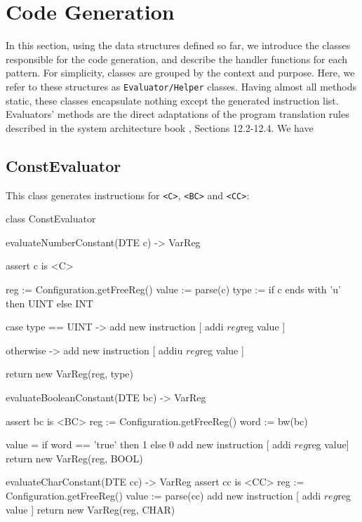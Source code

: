 \section{Code Generation}\label{sec:code_gen}
In this section, using the data structures defined so far, we introduce the classes responsible for the code generation, and describe the handler
functions for each pattern. For simplicity, classes are grouped by the context and purpose. Here, we refer to these structures as
\verb+Evaluator/Helper+ classes. Having almost all methods static, these classes encapsulate nothing except the generated instruction list.
Evaluators' methods are the direct adaptations of the program translation rules described in the system architecture book
\cite{sysbook}, Sections 12.2-12.4. We have
\subsection{ConstEvaluator}
This class generates instructions for \verb+<C>+, \verb+<BC>+ and \verb+<CC>+:
\begin{codeblock}
class ConstEvaluator {
    evaluateNumberConstant(DTE c) -> VarReg {
        assert c is <C>

        reg := Configuration.getFreeReg()
        value := parse(c)
        type := if c ends with 'u' then UINT else INT

        case type == UINT -> {
            add new instruction [ addi $reg $reg value ]
        }

        otherwise -> {
            add new instruction [ addiu $reg $reg value ]
        }

        return new VarReg(reg, type)
    }

    evaluateBooleanConstant(DTE bc) -> VarReg {
        assert bc is <BC>
        reg := Configuration.getFreeReg()
        word := bw(bc)

        value = if word == 'true' then 1 else 0
        add new instruction [ addi $reg $reg value]
        return new VarReg(reg, BOOL)
    }

    evaluateCharConstant(DTE cc) -> VarReg {
        assert cc is <CC>
        reg := Configuration.getFreeReg()
        value := parse(cc)
        add new instruction [ addi $reg $reg value ]
        return new VarReg(reg, CHAR)
    }
}
\end{codeblock}
